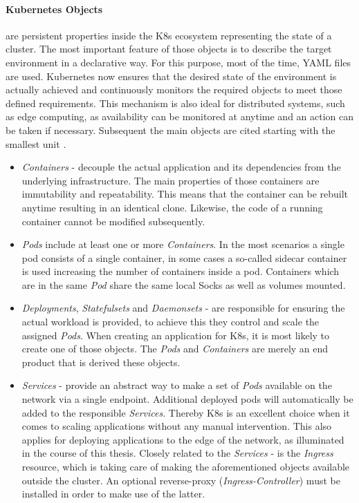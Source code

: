 \documentclass[MSC,Master,english]{twbook}%
\begin{document}
\paragraph{Kubernetes Objects} are persistent properties inside the \ac{K8s} ecosystem representing the state of a cluster. The most important feature of those objects is to describe the target environment in a declarative way. For this purpose, most of the time, YAML files are used. Kubernetes now ensures that the desired state of the environment is actually achieved and continuously monitors the required objects to meet those defined requirements. This mechanism is also ideal for distributed systems, such as edge computing, as availability can be monitored at anytime and an action can be taken if necessary. Subsequent the main objects are cited starting with the smallest unit \cite{k8sconc}.
\begin{itemize}
    \item \textit{Containers} - decouple the actual application and its dependencies from the underlying infrastructure. The main properties of those containers are immutability and repeatability. This means that the container can be rebuilt anytime resulting in an identical clone. Likewise, the code of a running container cannot be modified subsequently.
    \item \textit{Pods} include at least one or more \textit{Containers}. In the most scenarios a single pod consists of a single container, in some cases a so-called sidecar container is used increasing the number of containers inside a pod. Containers which are in the same \textit{Pod} share the same local Socks as well as volumes mounted.
    \item \textit{Deployments}, \textit{Statefulsets} and \textit{Daemonsets} - are responsible for ensuring the actual workload is provided, to achieve this they control and scale the assigned \textit{Pods}. When creating an application for \ac{K8s}, it is most likely to create one of those objects. The \textit{Pods} and \textit{Containers} are merely an end product that is derived these objects.
    \item \textit{Services} - provide an abstract way to make a set of \textit{Pods} available on the network via a single endpoint. Additional deployed pods will automatically be added to the responsible \textit{Services}. Thereby \ac{K8s} is an excellent choice when it comes to scaling applications without any manual intervention. This also applies for deploying applications to the edge of the network, as illuminated in the course of this thesis. Closely related to the \textit{Services} - is the \textit{Ingress} resource, which is taking care of making the aforementioned objects available outside the cluster. An optional reverse-proxy (\textit{Ingress-Controller}) must be installed in order to make use of the latter. \newline

\end{itemize}
\end{document}
